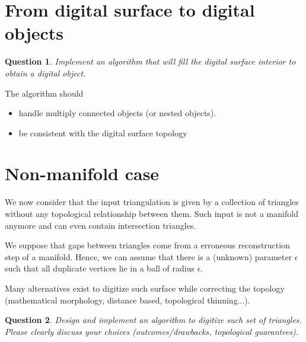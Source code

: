 \documentclass[a4paper, 11pt]{article}
\newtheorem{qu}{Question}
\begin{document}
\section{From digital surface to digital objects}

\begin{qu}
  Implement an algorithm that will fill the digital surface interior
  to obtain a digital object. 
\end{qu}

The algorithm should
\begin{itemize}
\item handle multiply connected objects (or nested objects).
\item be consistent with the digital surface topology 
\end{itemize}


\section{Non-manifold case}

We now consider that the input triangulation is given by a collection
of triangles without any topological relationship between them. Such
input is not a manifold anymore and can even contain intersection
triangles.

We suppose that gaps between triangles come from a erroneous
reconstruction step of a manifold. Hence, we can assume that there is
a (unknown) parameter $\epsilon$ such that all duplicate vertices lie
in a ball of radius $\epsilon$.

Many alternatives exist to digitize such surface while correcting the
topology (mathematical morphology, distance based, topological
thinning...).

\begin{qu}
  Design and implement an algorithm to digitize such set of
  triangles. Please clearly discuss your choices (outcomes/drawbacks,
  topological guarantees).
\end{qu}

\nocite{Cohen-Or1997,Schwarz2010,Laine2013}



\end{document}
